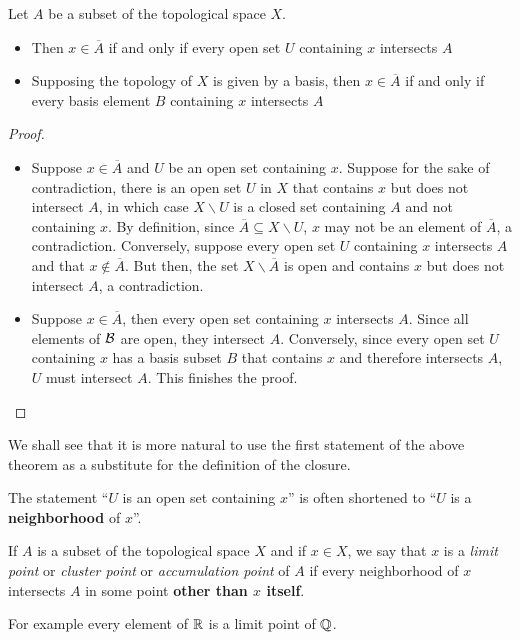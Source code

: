 \begin{theorem}
    Let $A$ be a subset of the topological space $X$.
    \begin{itemize}
        \item Then $x\in\overline{A}$ if and only if every open set $U$ containing $x$ intersects $A$ 
        \item Supposing the topology of $X$ is given by a basis, then $x\in\overline{A}$ if and only if every basis element $B$ containing $x$ intersects $A$
    \end{itemize}
\end{theorem}
\begin{proof}
    \hfill 
    \begin{itemize}
        \item Suppose $x\in\overline{A}$ and $U$ be an open set containing $x$. Suppose for the sake of contradiction, there is an open set $U$ in $X$ that contains $x$ but does not intersect $A$, in which case $X\backslash U$ is a closed set containing $A$ and not containing $x$. By definition, since $\overline{A}\subseteq X\backslash U$, $x$ may not be an element of $\overline{A}$, a contradiction. Conversely, suppose every open set $U$ containing $x$ intersects $A$ and that $x\notin\overline{A}$. But then, the set $X\backslash\overline{A}$ is open and contains $x$ but does not intersect $A$, a contradiction.
        \item Suppose $x\in\overline{A}$, then every open set containing $x$ intersects $A$. Since all elements of $\mathcal{B}$ are open, they intersect $A$. Conversely, since every open set $U$ containing $x$ has a basis subset $B$ that contains $x$ and therefore intersects $A$, $U$ must intersect $A$. This finishes the proof.
    \end{itemize}
\end{proof}

We shall see that it is more natural to use the first statement of the above theorem as a substitute for the definition of the closure.

The statement ``$U$ is an open set containing $x$'' is often shortened to ``$U$ is a \textbf{neighborhood} of $x$''.

\begin{definition}
    If $A$ is a subset of the topological space $X$ and if $x\in X$, we say that $x$ is a \textit{limit point} or \textit{cluster point} or \textit{accumulation point} of $A$ if every neighborhood of $x$ intersects $A$ in some point \textbf{other than $x$ itself}.
\end{definition}
For example every element of $\mathbb{R}$ is a limit point of $\mathbb{Q}$.

